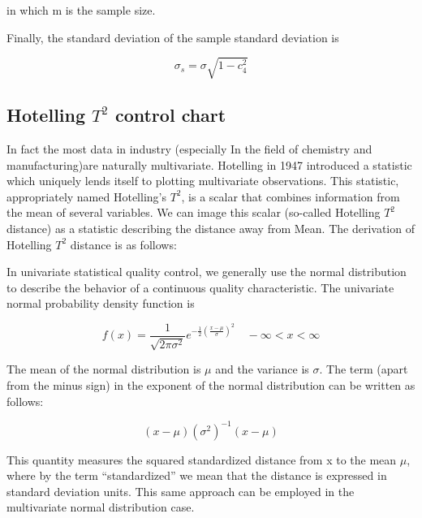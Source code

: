 in which m is the sample size.

Finally, the standard deviation of the sample standard deviation is

\begin{equation}
    \sigma_{s}=\sigma \sqrt{1-c_{4}^{2}}
    \label{equ:sigma_s}
\end{equation}

\subsection{Hotelling $T^{2}$ control chart}
In fact the most data in industry (especially In the field of chemistry and manufacturing)are naturally multivariate. Hotelling in 1947 introduced a statistic which uniquely lends itself to plotting multivariate observations. This statistic, appropriately named Hotelling's  $T^{2}$, is a scalar that combines information from the mean of several variables. We can image this scalar (so-called Hotelling $T^{2}$ distance) as a statistic describing the distance away from Mean. The derivation of Hotelling $T^{2}$ distance is as follows:

In univariate statistical quality control, we generally use the normal distribution to describe the behavior of a continuous quality characteristic. The univariate normal probability density function is


\begin{equation}
    f(x)=\frac{1}{\sqrt{2 \pi \sigma^{2}}} e^{-\frac{1}{2}\left(\frac{x-\mu}{\sigma}\right)^{2}} \quad-\infty<x<\infty
    \label{equ:normal_distribution}
\end{equation}

The mean of the normal distribution is $\mu$ and the variance is $\sigma$. The term (apart from the minus sign) in the exponent of the normal distribution can be written as follows:

\begin{equation}
    (x-\mu)\left(\sigma^{2}\right)^{-1}(x-\mu)
    \label{equ:normal_distribution_part}
\end{equation}

This quantity measures the squared standardized distance from x to the mean $\mu$, where by the term “standardized” we mean that the distance is expressed in standard deviation units. This same approach can be employed in the multivariate normal distribution case. 

